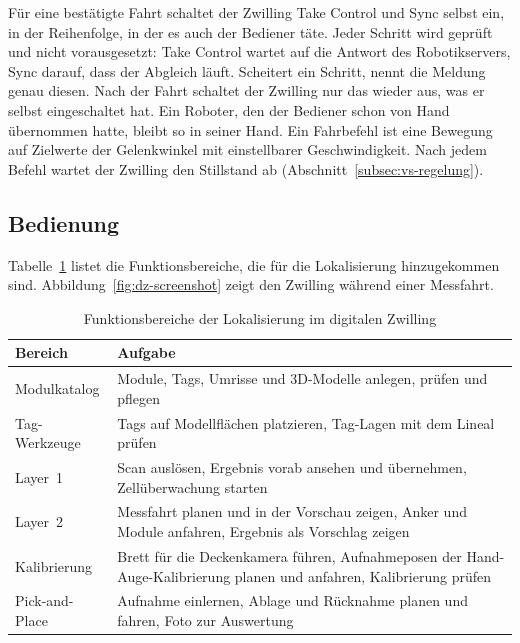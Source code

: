 Für eine bestätigte Fahrt schaltet der Zwilling Take Control und Sync selbst ein, in der Reihenfolge, in der es auch der Bediener täte. Jeder Schritt wird geprüft und nicht vorausgesetzt: Take Control wartet auf die Antwort des Robotikservers, Sync darauf, dass der Abgleich läuft. Scheitert ein Schritt, nennt die Meldung genau diesen. Nach der Fahrt schaltet der Zwilling nur das wieder aus, was er selbst eingeschaltet hat. Ein Roboter, den der Bediener schon von Hand übernommen hatte, bleibt so in seiner Hand. Ein Fahrbefehl ist eine Bewegung auf Zielwerte der Gelenkwinkel mit einstellbarer Geschwindigkeit. Nach jedem Befehl wartet der Zwilling den Stillstand ab (Abschnitt~\ref{subsec:vs-regelung}).

\subsection{Bedienung}
\label{subsec:dz-bedienung}
Tabelle~\ref{tab:dz-funktionen} listet die Funktionsbereiche, die für die Lokalisierung hinzugekommen sind. Abbildung~\ref{fig:dz-screenshot} zeigt den Zwilling während einer Messfahrt.

\begin{table}[htbp]
    \centering
    \caption{Funktionsbereiche der Lokalisierung im digitalen Zwilling}
    \label{tab:dz-funktionen}
    \begin{tabularx}{\textwidth}{lX}
        \toprule
        \textbf{Bereich} & \textbf{Aufgabe} \\
        \midrule
        Modulkatalog           & Module, Tags, Umrisse und 3D-Modelle anlegen, prüfen und pflegen \\
        Tag-Werkzeuge          & Tags auf Modellflächen platzieren, Tag-Lagen mit dem Lineal prüfen \\
        Layer~1                & Scan auslösen, Ergebnis vorab ansehen und übernehmen, Zellüberwachung starten \\
        Layer~2                & Messfahrt planen und in der Vorschau zeigen, Anker und Module anfahren, Ergebnis als Vorschlag zeigen \\
        Kalibrierung           & Brett für die Deckenkamera führen, Aufnahmeposen der Hand-Auge-Kalibrierung planen und anfahren, Kalibrierung prüfen \\
        Pick-and-Place         & Aufnahme einlernen, Ablage und Rücknahme planen und fahren, Foto zur Auswertung \\
        \bottomrule
    \end{tabularx}
\end{table}

